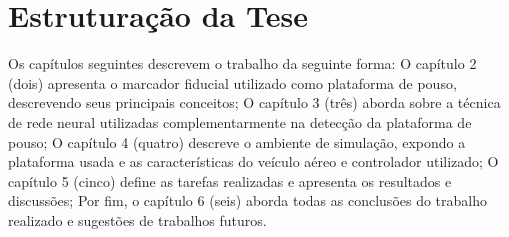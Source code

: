 \section{Estruturação da Tese}

Os capítulos seguintes descrevem o trabalho da seguinte forma: O capítulo 2 (dois) apresenta o marcador fiducial utilizado como plataforma de pouso, descrevendo seus principais conceitos; O capítulo 3 (três) aborda sobre a técnica de rede neural utilizadas complementarmente na detecção da plataforma de pouso; O capítulo 4 (quatro) descreve o ambiente de simulação, expondo a plataforma usada e as características do veículo aéreo e controlador utilizado; O capítulo 5 (cinco) define as tarefas realizadas e apresenta os resultados e discussões; Por fim, o capítulo 6 (seis) aborda todas as conclusões do trabalho realizado e sugestões de trabalhos futuros.




